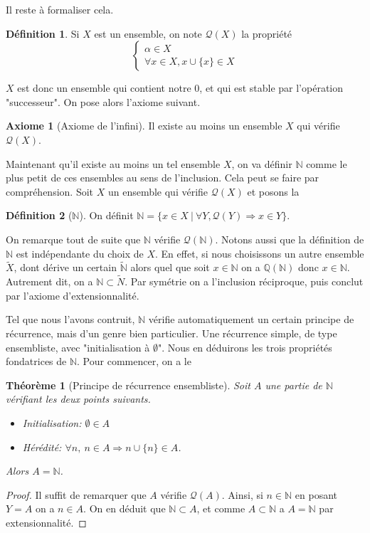 \documentclass[french]{book}
\newcommand{\N}{\mathbb{N}}
\theoremstyle{plain}
\newtheorem{thm}{Théorème}[chapter]
\theoremstyle{definition}
\newtheorem{dfn}{Définition}[chapter]
\newtheorem{ax}{Axiome}[chapter]
\theoremstyle{remark}
\begin{document}
Il reste à formaliser cela.

\begin{dfn}
	Si $X$ est un ensemble, on note $\mathcal{Q}(X)$ la propriété $$\begin{cases}
	\alpha \in X \\
	\forall x \in X, x \cup \{x\} \in X
\end{cases}$$
\end{dfn}

$X$ est donc un ensemble qui contient notre $0$, et qui est stable par l'opération "successeur".
On pose alors l'axiome suivant.

\begin{ax}[Axiome de l'infini]
	Il existe au moins un ensemble $X$ qui vérifie $\mathcal{Q}(X)$.
\end{ax}

Maintenant qu'il existe au moins un tel ensemble $X$, on va définir $\mathbb{N}$ comme le plus petit de ces ensembles au sens de l'inclusion. Cela peut se faire par compréhension. Soit $X$ un ensemble qui vérifie $\mathcal{Q}(X)$ et posons la

\begin{dfn}[$\N$]
	On définit $\mathbb{N} = \{x \in X\ | \ \forall Y, \mathcal{Q}(Y) \Rightarrow x \in Y\}$.
\end{dfn}
On remarque tout de suite que $\mathbb{N}$ vérifie $\mathcal{Q}(\mathbb{N})$. Notons aussi que la définition de $\mathbb{N}$ est indépendante du choix de $X$. En effet, si nous choisissons un autre ensemble $\tilde{X}$, dont dérive un certain $\tilde{\mathbb{N}}$ alors quel que soit $x \in \mathbb{N}$ on a $\mathbb{Q}(\mathbb{N})$ donc $x \in \mathbb{N}$. Autrement dit, on a $\mathbb{N} \subset \tilde{N}$. Par symétrie on a l'inclusion réciproque, puis conclut par l'axiome d'extensionnalité.\par 
Tel que nous l'avons contruit, $\mathbb{N}$ vérifie automatiquement un certain principe de récurrence, mais d'un genre bien particulier. Une récurrence simple, de type ensembliste, avec "initialisation à $\emptyset$". Nous en déduirons les trois propriétés fondatrices de $\mathbb{N}$. Pour commencer, on a le

\begin{thm}[Principe de récurrence ensembliste]
	Soit $A$ une partie de $\mathbb{N}$ vérifiant les deux points suivants.
\begin{itemize}
	\item Initialisation: $\emptyset \in A$
	\item Hérédité: $\forall n,\ n \in A \Rightarrow n \cup \{n\} \in A$.
\end{itemize}
Alors $A = \mathbb{N}$.
\end{thm}
\begin{proof}
	Il suffit de remarquer que $A$ vérifie $\mathcal{Q}(A)$. Ainsi, si $n \in \mathbb{N}$ en posant $Y = A$ on a $n \in A$. On en déduit que $\mathbb{N} \subset A$, et comme $A \subset \mathbb{N}$ a $A = \mathbb{N}$ par extensionnalité.
\end{proof}
\end{document}
